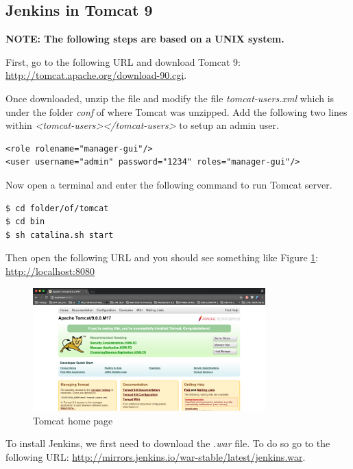 \subsection{Jenkins in Tomcat 9}
\textbf{NOTE: The following steps are based on a UNIX system.}

First, go to the following URL and download Tomcat 9: \url{http://tomcat.apache.org/download-90.cgi}.

Once downloaded, unzip the file and modify the file \emph{tomcat-users.xml} which is under the folder \emph{conf} of where Tomcat was unzipped. Add the following two lines within \emph{<tomcat-users></tomcat-users>} to setup an admin user.

\begin{verbatim}
<role rolename="manager-gui"/>
<user username="admin" password="1234" roles="manager-gui"/>
\end{verbatim}

Now open a terminal and enter the following command to run Tomcat server.

\begin{verbatim}
$ cd folder/of/tomcat
$ cd bin
$ sh catalina.sh start
\end{verbatim}

Then open the following URL and you should see something like Figure \ref{fig:tomcat-01}: \url{http://localhost:8080}

\begin{figure}[H]
	\centering
    \includegraphics[width=0.8\textwidth]{grafiken/tomcat-01}
    \caption{Tomcat home page}
    \label{fig:tomcat-01}
\end{figure}

To install Jenkins, we first need to download the \emph{.war} file. To do so go to the following URL: \url{http://mirrors.jenkins.io/war-stable/latest/jenkins.war}.

